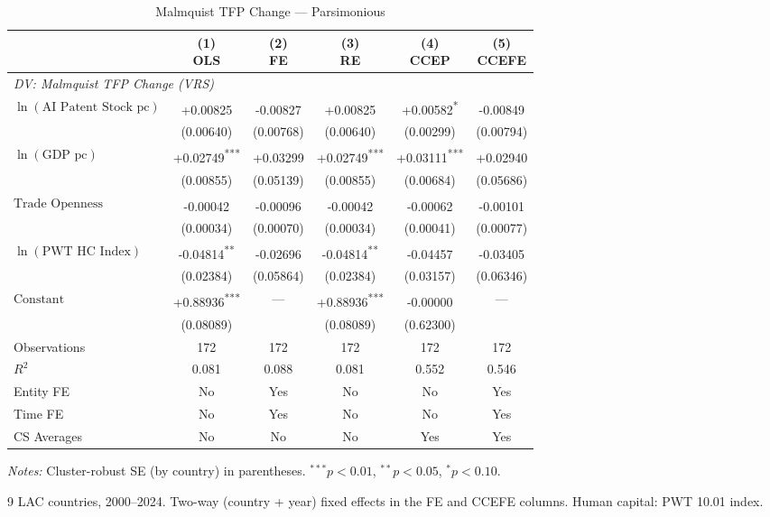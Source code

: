 \begin{table}[htbp]
\centering
\small
\caption{Malmquist TFP Change --- Parsimonious}
\label{tab:tab_malmquist_pars}
\begin{tabular}{lccccc}
\toprule
 & \makecell{(1)\\OLS} & \makecell{(2)\\FE} & \makecell{(3)\\RE} & \makecell{(4)\\CCEP} & \makecell{(5)\\CCEFE} \\
\midrule
\multicolumn{6}{l}{\textit{DV: Malmquist TFP Change (VRS)}} \\[4pt]
$\ln(\text{AI Patent Stock pc})$ & +0.00825\textsuperscript{} & -0.00827\textsuperscript{} & +0.00825\textsuperscript{} & +0.00582\textsuperscript{*} & -0.00849\textsuperscript{} \\
 & (0.00640) & (0.00768) & (0.00640) & (0.00299) & (0.00794) \\[2pt]
$\ln(\text{GDP pc})$ & +0.02749\textsuperscript{***} & +0.03299\textsuperscript{} & +0.02749\textsuperscript{***} & +0.03111\textsuperscript{***} & +0.02940\textsuperscript{} \\
 & (0.00855) & (0.05139) & (0.00855) & (0.00684) & (0.05686) \\[2pt]
$\text{Trade Openness}$ & -0.00042\textsuperscript{} & -0.00096\textsuperscript{} & -0.00042\textsuperscript{} & -0.00062\textsuperscript{} & -0.00101\textsuperscript{} \\
 & (0.00034) & (0.00070) & (0.00034) & (0.00041) & (0.00077) \\[2pt]
$\ln(\text{PWT HC Index})$ & -0.04814\textsuperscript{**} & -0.02696\textsuperscript{} & -0.04814\textsuperscript{**} & -0.04457\textsuperscript{} & -0.03405\textsuperscript{} \\
 & (0.02384) & (0.05864) & (0.02384) & (0.03157) & (0.06346) \\[2pt]
$\text{Constant}$ & +0.88936\textsuperscript{***} & --- & +0.88936\textsuperscript{***} & -0.00000\textsuperscript{} & --- \\
 & (0.08089) &  & (0.08089) & (0.62300) &  \\[2pt]
\midrule
Observations & 172 & 172 & 172 & 172 & 172 \\
$R^2$ & 0.081 & 0.088 & 0.081 & 0.552 & 0.546 \\
Entity FE & No & Yes & No & No & Yes \\
Time FE & No & Yes & No & No & Yes \\
CS Averages & No & No & No & Yes & Yes \\
\bottomrule
\end{tabular}
\begin{tablenotes}
\footnotesize
\item \textit{Notes:} Cluster-robust SE (by country) in parentheses. $^{***}p<0.01$, $^{**}p<0.05$, $^{*}p<0.10$.
\item 9 LAC countries, 2000--2024. Two-way (country + year) fixed effects in the FE and CCEFE columns. Human capital: PWT 10.01 index.
\end{tablenotes}
\end{table}